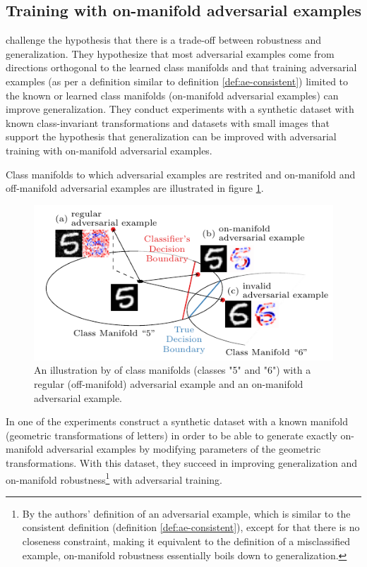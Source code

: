 \documentclass[conference,compsoc]{IEEEtran}
\begin{document}
\subsection{Training with on-manifold adversarial examples}

\citet{Stutz:2018:DARG} challenge the hypothesis that there is a trade-off between robustness and generalization. They hypothesize that most adversarial examples come from directions orthogonal to the learned class manifolds and that training adversarial examples (as per a definition similar to definition \ref{def:ae-consistent}) limited to the known or learned class manifolds (on-manifold adversarial examples) can improve generalization. They conduct experiments with a synthetic dataset with known class-invariant transformations and datasets with small images that support the hypothesis that generalization can be improved with adversarial training with on-manifold adversarial examples.

Class manifolds to which adversarial examples are restrited and on-manifold and off-manifold adversarial examples are illustrated in figure \ref{fig:stutz-illustration}.

\begin{figure}[htbp!]
	\begin{center}
		\includegraphics[width=\columnwidth]{figures/adversarial-examples/stutz-introduction_b.pdf}
	\end{center}
	\caption{An illustration by \citet{Stutz:2018:DARG} of class manifolds (classes "5" and "6") with a regular (off-manifold) adversarial example and an on-manifold adversarial example.}
	\label{fig:stutz-illustration}
\end{figure}

In one of the experiments \citet{Stutz:2018:DARG} construct a synthetic dataset with a known manifold (geometric transformations of letters) in order to be able to generate exactly on-manifold adversarial examples by modifying parameters of the geometric transformations. With this dataset, they succeed in improving generalization and on-manifold robustness\footnote{By the authors' definition of an adversarial example, which is similar to the consistent definition (definition \ref{def:ae-consistent}), except for that there is no closeness constraint, making it equivalent to the definition of a misclassified example, on-manifold robustness essentially boils down to generalization.} with adversarial training.
\end{document}
